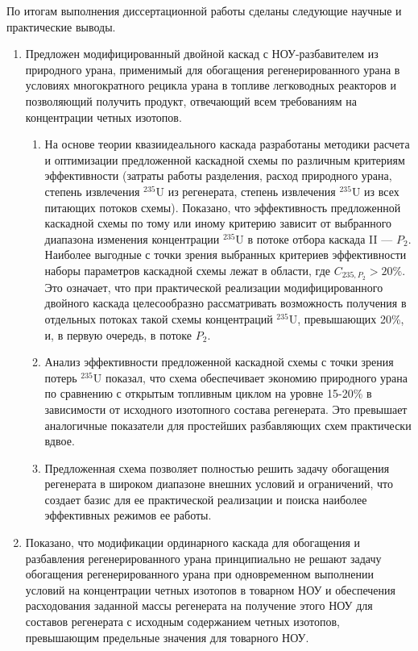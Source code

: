 По итогам выполнения диссертационной работы сделаны следующие научные и практические выводы.
\begin{enumerate}[label=\Roman*.]
\item Предложен модифицированный двойной каскад с НОУ-разбавителем из природного урана, применимый  для обогащения регенерированного урана в условиях многократного рецикла урана в топливе легководных реакторов и позволяющий получить продукт, отвечающий всем требованиям на концентрации четных изотопов. 

\begin{enumerate}
    \item На основе теории квазиидеального каскада разработаны методики расчета и оптимизации предложенной каскадной схемы по различным критериям эффективности (затраты работы разделения, расход природного урана, степень извлечения $^{235}$U из регенерата, степень извлечения $^{235}$U из всех питающих потоков схемы). Показано, что эффективность предложенной каскадной схемы по тому или иному критерию зависит от выбранного диапазона изменения концентрации $^{235}$U в потоке отбора каскада II --- $P_2$. Наиболее выгодные с точки зрения выбранных критериев эффективности наборы параметров каскадной схемы лежат в области, где $C_{235,{P_2}} > 20\%$. Это означает, что при практической реализации модифицированного двойного каскада целесообразно рассматривать возможность получения в отдельных потоках такой схемы концентраций $^{235}$U, превышающих 20\%, и, в первую очередь, в потоке $P_2$. 
    \item Анализ эффективности предложенной каскадной схемы с точки зрения потерь $^{235}$U показал, что схема обеспечивает экономию природного урана по сравнению с открытым топливным циклом на уровне 15-20\% в зависимости от исходного изотопного состава регенерата. Это превышает аналогичные показатели для простейших разбавляющих схем практически вдвое.
    \item Предложенная схема позволяет полностью решить задачу обогащения регенерата в широком диапазоне внешних условий и ограничений, что создает базис для ее практической реализации и поиска наиболее эффективных режимов ее работы.
\end{enumerate}

\item Показано, что модификации ординарного каскада для обогащения и разбавления регенерированного урана принципиально не решают задачу обогащения регенерированного урана при одновременном выполнении условий на концентрации четных изотопов в товарном НОУ и обеспечения расходования заданной массы регенерата на получение этого НОУ для составов регенерата с исходным содержанием четных изотопов, превышающим предельные значения для товарного НОУ. 


\end{enumerate}
